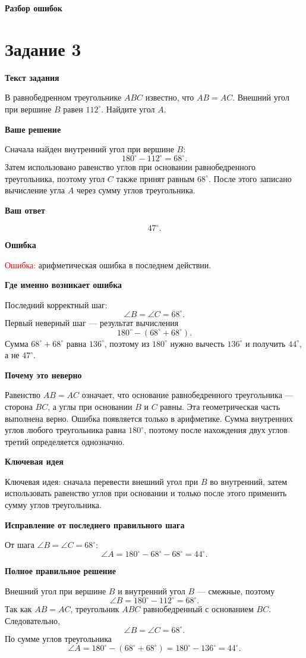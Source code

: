 \documentclass[12pt,a4paper]{article}
\newcommand{\tasktitle}[1]{%
  \phantomsection\label{task:#1}%
  \section*{Задание #1}%
}
\newcommand{\errorlabel}[1]{\textcolor{red}{Ошибка:} #1}
\newcommand{\keyidea}[1]{\textcolor{blue!60!black}{Ключевая идея:} #1}
\newcommand{\subhead}[1]{\vspace{0.3em}\textbf{#1}\par}
\begin{document}
\newpage
\thispagestyle{empty}
\vspace*{\fill}
\begin{center}
{\Huge\bfseries Разбор ошибок}
\end{center}
\vspace*{\fill}

\newpage
\tasktitle{3}

\subhead{Текст задания}
В равнобедренном треугольнике $ABC$ известно, что $AB=AC$.
Внешний угол при вершине $B$ равен $112^\circ$.
Найдите угол $A$.

\subhead{Ваше решение}
Сначала найден внутренний угол при вершине $B$:
\[
180^\circ-112^\circ=68^\circ.
\]
Затем использовано равенство углов при основании равнобедренного
треугольника, поэтому угол $C$ также принят равным $68^\circ$.
После этого записано вычисление угла $A$ через сумму углов треугольника.

\subhead{Ваш ответ}
\[
47^\circ.
\]

\subhead{Ошибка}
\errorlabel{арифметическая ошибка в последнем действии.}

\subhead{Где именно возникает ошибка}
Последний корректный шаг:
\[
\angle B=\angle C=68^\circ.
\]
Первый неверный шаг --- результат вычисления
\[
180^\circ-(68^\circ+68^\circ).
\]
Сумма $68^\circ+68^\circ$ равна $136^\circ$, поэтому из $180^\circ$
нужно вычесть $136^\circ$ и получить $44^\circ$, а не $47^\circ$.

\subhead{Почему это неверно}
Равенство $AB=AC$ означает, что основание равнобедренного треугольника
--- сторона $BC$, а углы при основании $B$ и $C$ равны.
Эта геометрическая часть выполнена верно.
Ошибка появляется только в арифметике.
Сумма внутренних углов любого треугольника равна $180^\circ$,
поэтому после нахождения двух углов третий определяется однозначно.

\subhead{Ключевая идея}
\keyidea{сначала перевести внешний угол при $B$ во внутренний,
затем использовать равенство углов при основании и только после этого
применить сумму углов треугольника.}

\subhead{Исправление от последнего правильного шага}
От шага $\angle B=\angle C=68^\circ$:
\[
\angle A=180^\circ-68^\circ-68^\circ=44^\circ.
\]

\subhead{Полное правильное решение}
Внешний угол при вершине $B$ и внутренний угол $B$ --- смежные, поэтому
\[
\angle B=180^\circ-112^\circ=68^\circ.
\]
Так как $AB=AC$, треугольник $ABC$ равнобедренный с основанием $BC$.
Следовательно,
\[
\angle B=\angle C=68^\circ.
\]
По сумме углов треугольника
\[
\angle A
=180^\circ-(68^\circ+68^\circ)
=180^\circ-136^\circ
=44^\circ.
\]
\end{document}
